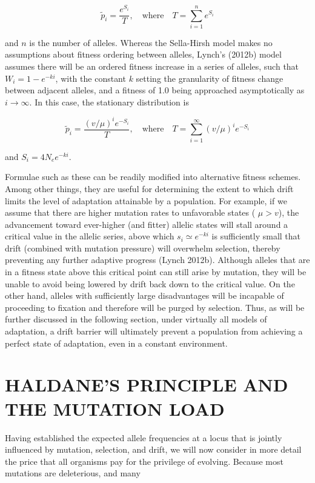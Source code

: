 \documentclass{article}
\begin{document}
\begin{equation}
\widetilde{p}_{i}=\frac{e^{S_{i}}}{T},\quad\mathrm{w h e r e}\quad T=\sum_{i=1}^{n}e^{S_{i}}
\tag{7.38}
\label{eq:7_38}
\end{equation}

and $n$ is the number of alleles. Whereas the Sella-Hirsh model makes no assumptions about fitness ordering between alleles, Lynch's (2012b) model assumes there will be an ordered fitness increase in a series of alleles, such that $W_i = 1 - e^{-ki}$, with the constant $k$ setting the granularity of fitness change between adjacent alleles, and a fitness of 1.0 being approached asymptotically as $i \to \infty$. In this case, the stationary distribution is

\begin{equation}
\widetilde{p}_{i}=\frac{(v/\mu)^{i}e^{-S_{i}}}{T},\quad\mathrm{w h e r e}\quad T=\sum_{i=1}^{\infty}(v/\mu)^{i}e^{-S_{i}}
\tag{7.39}
\label{eq:7_39}
\end{equation}

and  $ S_i = 4N_e e^{-ki} $.

Formulae such as these can be readily modified into alternative fitness schemes. Among other things, they are useful for determining the extent to which drift limits the level of adaptation attainable by a population. For example, if we assume that there are higher mutation rates to unfavorable states ( $ \mu > v $), the advancement toward ever-higher (and fitter) allelic states will stall around a critical value in the allelic series, above which  $ s_i \simeq e^{-ki} $ is sufficiently small that drift (combined with mutation pressure) will overwhelm selection, thereby preventing any further adaptive progress (Lynch 2012b). Although alleles that are in a fitness state above this critical point can still arise by mutation, they will be unable to avoid being lowered by drift back down to the critical value. On the other hand, alleles with sufficiently large disadvantages will be incapable of proceeding to fixation and therefore will be purged by selection. Thus, as will be further discussed in the following section, under virtually all models of adaptation, a drift barrier will ultimately prevent a population from achieving a perfect state of adaptation, even in a constant environment.

\section{HALDANE'S PRINCIPLE AND THE MUTATION LOAD}
Having established the expected allele frequencies at a locus that is jointly influenced by mutation, selection, and drift, we will now consider in more detail the price that all organisms pay for the privilege of evolving. Because most mutations are deleterious, and many
\end{document}
